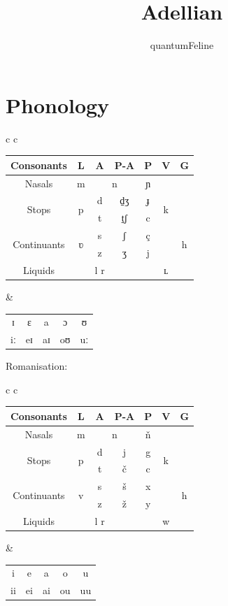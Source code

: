 \documentclass[12pt]{article}
\newcommand{\tworow}[1]{
	\multirow{2}{*}{#1}
}
\begin{document}
	\title{Adellian}
	\author{quantumFeline}
	\maketitle

	\tableofcontents

	\section{Phonology}
	
	\begin{tabular} { c c }

		\begin{tabular}{||c | c c c c c c ||}
			\hline
			Consonants & L & A & P-A & P & V & G \\
			\hline
			Nasals & m & \multicolumn{2}{c}{n} & ɲ & & \\
			\tworow{Stops} & \tworow{p} & d & d̠ʒ & ɟ & \tworow{k} & \\
			& & t & t̠ʃ & c & & \\
			\tworow{Continuants} & \tworow{ʋ} & s & ʃ & ç & & \tworow{h} \\
			& & z & ʒ & j & & \\
			Liquids & & l r & & & ʟ & \\
			\hline
		\end{tabular}
		
		&
	
		\begin{tabular}{|| c c c c c || }
			\hline
			ɪ & ɛ & a & ɔ & ʊ \\
			iː & eɪ & aɪ & oʊ & uː \\
			\hline
		\end{tabular}
	
	\end{tabular}
	
	Romanisation:
	
	\begin{tabular} { c c }

		\begin{tabular}{||c | c c c c c c ||}
			\hline
			Consonants & L & A & P-A & P & V & G \\
			\hline
			Nasals & m & \multicolumn{2}{c}{n} & ň & & \\
			\tworow{Stops} & \tworow{p} & d & j & g & \tworow{k} & \\
			& & t & č & c & & \\
			\tworow{Continuants} & \tworow{v} & s & š & x & & \tworow{h} \\
			& & z & ž & y & & \\
			Liquids & & l r & & & w & \\
			\hline
		\end{tabular}
		
		&
	
		\begin{tabular}{|| c c c c c || }
			\hline
			i & e & a & o & u \\
			ii & ei & ai & ou & uu \\
			\hline
		\end{tabular}
	
	\end{tabular}
\end{document}
